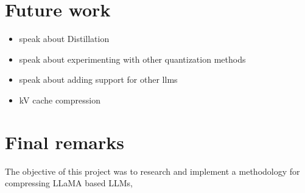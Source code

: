 \section{Future work}
\begin{itemize}
    \item speak about Distillation
    \item speak about experimenting with other quantization methods
    \item speak about adding support for other llms
    \item kV cache compression
\end{itemize}
\section{Final remarks}
The objective of this project was to research and implement a methodology for compressing LLaMA based LLMs, 